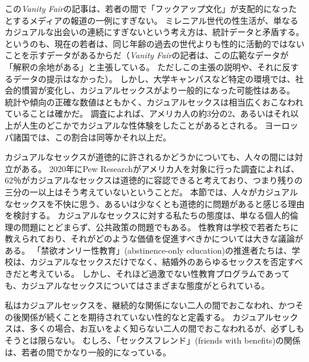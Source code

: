 \documentclass[paper=a4,book,openany]{jlreq}
\begin{document}
この\emph{Vanity Fair}の記事は、若者の間で「フックアップ文化」が支配的になったとするメディアの報道の一例にすぎない。
ミレニアル世代の性生活が、単なるカジュアルな出会いの連続にすぎないという考え方は、統計データと矛盾する。
というのも、現在の若者は、同じ年齢の過去の世代よりも性的に活動的ではないことを示すデータがあるからだ\citep[cf.][]{twenge17:_declin_sexual_frequen,twenge17:_sexual_inact_durin,monto14:_new_stand_sexual_behav}（\emph{Vanity Fair}の記者は、この広範なデータが「解釈の余地がある」と主張している。
ただしこの主張の説明や、それに反するデータの提示はなかった）。
しかし、大学キャンパスなど特定の環境では、社会的慣習が変化し、カジュアルセックスがより一般的になった可能性はある\citep[cf.][]{bogle08:_hookin}。
統計や傾向の正確な数値はともかく、カジュアルセックスは相当広くおこなわれていることは確かだ。
調査によれば、アメリカ人の約3分の2、あるいはそれ以上が人生のどこかでカジュアルな性体験をしたことがあるとされる。
ヨーロッパ諸国では、この割合は同等かそれ以上だ\citep{met17:_one_nigh_stan,how15:_this_is_how}。

カジュアルなセックスが道徳的に許されるかどうかについても、人々の間には対立がある。
2020年にPew Researchがアメリカ人を対象に行った調査によれば、62％がカジュアルなセックスは道徳的に容認できると考えており、つまり残りの三分の一以上はそう考えていないということだ\citep{brow20:_near_half_u}。
本節では、人々がカジュアルなセックスを不快に思う、あるいは少なくとも道徳的に問題があると感じる理由を検討する。
カジュアルなセックスに対する私たちの態度は、単なる個人的倫理の問題にとどまらず、公共政策の問題でもある。
性教育は学校で若者たちに教えられており、それがどのような価値を促進すべきかについては大きな議論がある。
「禁欲オンリー性教育」(abstinence-only education)の推進者たちは、学校は、カジュアルなセックスだけでなく、結婚外のあらゆるセックスを否定すべきだと考えている。
しかし、それほど過激でない性教育プログラムであっても、カジュアルなセックスについてはさまざまな態度がとられている。

私はカジュアルセックスを、継続的な関係にない二人の間でおこなわれ、かつその後関係が続くことを期待されていない性的なと定義する。
カジュアルセックスは、多くの場合、お互いをよく知らない二人の間でおこなわれるが、必ずしもそうとは限らない。
むしろ、「セックスフレンド」(friends with benefits)の関係は、若者の間でかなり一般的になっている\citep{dube17:_why_frien_benef}。
\end{document}
